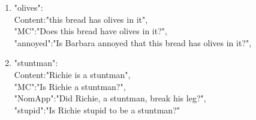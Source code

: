 \documentclass[11pt,fleqn]{article}
\newcommand{\6}{\mbox{$[\hspace*{-.6mm}[$}}
\newcommand{\9}{\mbox{$]\hspace*{-.6mm}]$}}
\begin{document}
\begin{enumerate}
\item "olives": \\
   	Content:"this bread has olives in it",\\
   	"MC":"Does this bread have olives in it?",\\
   	"annoyed":"Is Barbara annoyed that this bread has olives in it?",\\

\item "stuntman": \\
   	Content:"Richie is a stuntman",\\
   	"MC":"Is Richie a stuntman?",\\
   	"NomApp":"Did Richie, a stuntman, break his leg?",\\
   	"stupid":"Is Richie stupid to be a stuntman?"

\end{enumerate}



\end{document}
